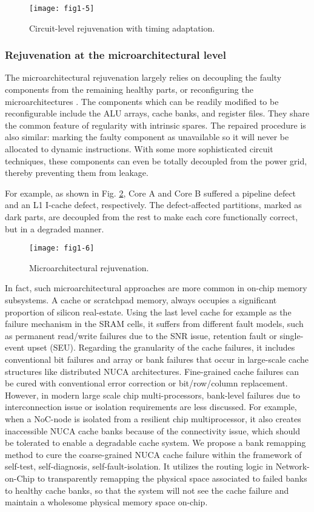\begin{figure}[t]
\centering
\texttt{[image: fig1-5]}
\caption{Circuit-level rejuvenation with timing adaptation.}
\label{fig:circuit-repair} 
\end{figure}


\subsubsection{Rejuvenation at the microarchitectural level}
The microarchitectural rejuvenation largely relies on decoupling the faulty components from the remaining healthy parts, or reconfiguring the microarchitectures \cite{powell2009architectural}. The components which can be readily modified to be reconfigurable include the ALU arrays, cache banks, and register files. They share the common feature of regularity with intrinsic spares. The repaired procedure is also similar: marking the faulty component as unavailable so it will never be allocated to dynamic instructions. With some more sophisticated circuit techniques, these components can even be totally decoupled from the power grid, thereby preventing them from leakage.

For example, as shown in Fig. \ref{fig:microarch-repair}, Core A and Core B suffered a pipeline defect and an L1 I-cache defect, respectively. The defect-affected partitions, marked as dark parts, are decoupled from the rest to make each core functionally correct, but in a degraded manner.

\begin{figure}[t]
\centering
\texttt{[image: fig1-6]}
\caption{Microarchitectural rejuvenation.}
\label{fig:microarch-repair} 
\end{figure}

In fact, such microarchitectural approaches are more common in on-chip memory subsystems. A cache or scratchpad memory, always occupies a significant proportion of silicon real-estate. Using the last level cache for example as the failure mechanism in the SRAM cells, it suffers from different fault models, such as permanent read/write failures due to the SNR issue, retention fault or single-event upset (SEU). Regarding the granularity of the cache failures, it includes conventional bit failures and array or bank failures that occur in large-scale cache structures like distributed NUCA architectures. Fine-grained cache failures can be cured with conventional error correction or bit/row/column replacement. However, in modern large scale chip multi-processors, bank-level failures due to interconnection issue or isolation requirements are less discussed. For example, when a NoC-node is isolated from a resilient chip multiprocessor, it also creates inaccessible NUCA cache banks because of the connectivity issue, which should be tolerated to enable a degradable cache system. We propose a bank remapping method to cure the coarse-grained NUCA cache failure within the framework of self-test, self-diagnosis, self-fault-isolation. It utilizes the routing logic in Network-on-Chip to transparently remapping the physical space associated to failed banks to healthy cache banks, so that the system will not see the cache failure and maintain a wholesome physical memory space on-chip. 

